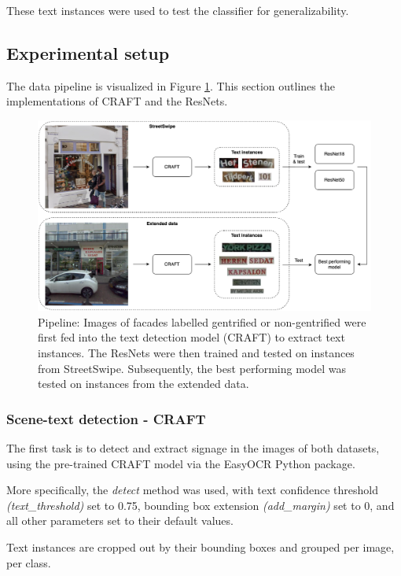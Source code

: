 These text instances were used to test the classifier for generalizability.


\subsection{Experimental setup}

The data pipeline is visualized in Figure \ref{fig:pipeline}. This section outlines the implementations of CRAFT and the ResNets.

\begin{figure}
    \centering
    \includegraphics[width=\textwidth]{media/methodology/Pipeline.png}
    \caption{Pipeline: Images of facades labelled gentrified or non-gentrified were first fed into the text detection model (CRAFT) to extract text instances. The ResNets were then trained and tested on instances from StreetSwipe. Subsequently, the best performing model was tested on instances from the extended data.}
    \label{fig:pipeline}
\end{figure}


\subsubsection{Scene-text detection - CRAFT}

The first task is to detect and extract signage in the images of both datasets, using the pre-trained CRAFT model via the EasyOCR Python package.

More specifically, the \textit{detect} method was used, with text confidence threshold \textit{(text\_threshold)} set to 0.75, bounding box extension \textit{(add\_margin)} set to 0, and all other parameters set to their default values.

Text instances are cropped out by their bounding boxes and grouped per image, per class. 


